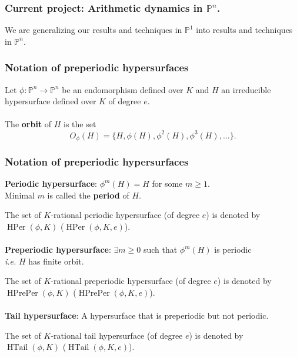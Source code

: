 \documentclass{beamer}
\def\PP{{\mathbb P}}
\DeclareMathOperator{\HTail}{HTail}
\DeclareMathOperator{\HPer}{HPer}
\DeclareMathOperator{\HPrePer}{HPrePer}
\theoremstyle{thmstyle}
\theoremstyle{thmstyle}
\theoremstyle{mystyle}
\theoremstyle{qstnstyle}
\begin{document}
\begin{frame}
\frametitle{Current project: Arithmetic dynamics in $\PP^n$.}


We are generalizing our results and techniques in $\PP^1$ into results and techniques in $\PP^n$.

\end{frame}

\begin{frame}
\frametitle{Notation of preperiodic hypersurfaces}
 
Let $\phi:\mathbb{P}^n\to\mathbb{P}^n$ be an endomorphism defined over $K$ and $H$ an irreducible hypersurface defined over $K$ of degree $e$.
\\\quad\\
 
The \textbf{orbit} of $H$ is the set 
$$ O_{\phi}(H) = \{H, \phi(H),\phi^2(H),\phi^3(H),\ldots \}.$$

\end{frame}


\begin{frame}
\frametitle{Notation of preperiodic hypersurfaces}

\textbf{Periodic hypersurface}: $\phi^m(H)=H$ for some $m\geq{1}$.
\\\quad\quad  Minimal $m$ is called the \textbf{period} of $H$.


\vspace{2mm}
The set of $K$-rational periodic hypersurface (of degree $e$) is denoted by $\HPer(\phi,K)$ ($\HPer(\phi,K,e)$).
\\\quad\\

\textbf{Preperiodic hypersurface}: $\exists m\geq{0}$ such that $\phi^m(H)$
is periodic \\\quad\quad  \emph{i.e.}  $H$ has finite orbit.


\vspace{2mm}
The set of $K$-rational preperiodic hypersurface (of degree $e$) is denoted by $\HPrePer(\phi,K)$ ($\HPrePer(\phi,K,e)$).
\\\quad\\

\textbf{Tail hypersurface}: A hypersurface that is preperiodic but not periodic.


\vspace{2mm}
The set of $K$-rational tail hypersurface (of degree $e$) is denoted by $\HTail(\phi,K)$ ($\HTail(\phi,K,e)$).
\end{frame}
\end{document}
